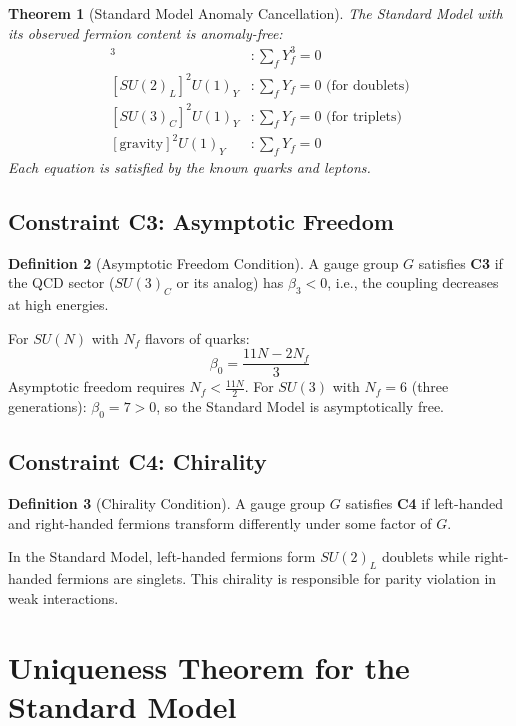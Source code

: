 \documentclass[11pt,a4paper,openright]{book}
\theoremstyle{plain}
\newtheorem{theorem}{Theorem}[chapter]
\theoremstyle{definition}
\newtheorem{definition}[theorem]{Definition}
\begin{document}
\begin{theorem}[Standard Model Anomaly Cancellation]
The Standard Model with its observed fermion content is anomaly-free:
\begin{align}
[U(1)_Y]^3 &: \sum_f Y_f^3 = 0 \\
[SU(2)_L]^2 U(1)_Y &: \sum_f Y_f = 0 \text{ (for doublets)} \\
[SU(3)_C]^2 U(1)_Y &: \sum_f Y_f = 0 \text{ (for triplets)} \\
[\text{gravity}]^2 U(1)_Y &: \sum_f Y_f = 0
\end{align}
Each equation is satisfied by the known quarks and leptons.
\end{theorem}

\subsection{Constraint C3: Asymptotic Freedom}

\begin{definition}[Asymptotic Freedom Condition]
A gauge group $G$ satisfies \textbf{C3} if the QCD sector ($SU(3)_C$ or its analog) has $\beta_3 < 0$, i.e., the coupling decreases at high energies.
\end{definition}

For $SU(N)$ with $N_f$ flavors of quarks:
\begin{equation}
\beta_0 = \frac{11N - 2N_f}{3}
\end{equation}
Asymptotic freedom requires $N_f < \frac{11N}{2}$. For $SU(3)$ with $N_f = 6$ (three generations): $\beta_0 = 7 > 0$, so the Standard Model is asymptotically free.

\subsection{Constraint C4: Chirality}

\begin{definition}[Chirality Condition]
A gauge group $G$ satisfies \textbf{C4} if left-handed and right-handed fermions transform differently under some factor of $G$.
\end{definition}

In the Standard Model, left-handed fermions form $SU(2)_L$ doublets while right-handed fermions are singlets. This chirality is responsible for parity violation in weak interactions.

\section{Uniqueness Theorem for the Standard Model}
\end{document}
